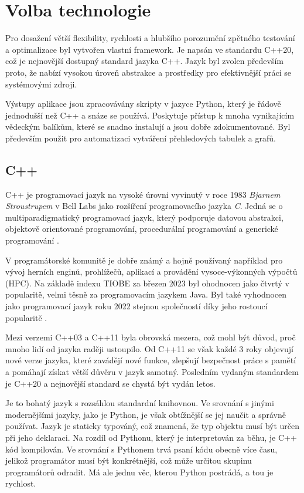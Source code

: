 \chapter{Volba technologie}
Pro dosažení větší flexibility, rychlosti a hlubšího porozumění zpětného testování a optimalizace byl vytvořen vlastní framework.
Je napsán ve standardu C++20, což je nejnovější dostupný standard jazyka C++.
Jazyk byl zvolen především proto, že nabízí vysokou úroveň abstrakce a prostředky pro efektivnější práci se systémovými zdroji.

Výstupy aplikace jsou zpracovávány skripty v jazyce Python, který je řádově jednodušší než C++ a snáze se používá.
Poskytuje přístup k mnoha vynikajícím vědeckým balíkům, které se snadno instalují a jsou dobře zdokumentované.
Byl především použit pro automatizaci vytváření přehledových tabulek a grafů.

\section{C++}
C++ je programovací jazyk na vysoké úrovni vyvinutý v roce 1983 \textit{Bjarnem Stroustrupem} v Bell Labs jako rozšíření programovacího jazyka \textit{C}.
Jedná se o multiparadigmatický programovací jazyk, který podporuje datovou abstrakci, objektově orientované programování, procedurální programování a generické programování \cite{cpp}.

V programátorské komunitě je dobře známý a hojně používaný například pro vývoj herních enginů, prohlížečů, aplikací a provádění vysoce-výkonných výpočtů (HPC).
Na základě indexu TIOBE za březen 2023 byl ohodnocen jako čtvrtý v popularitě, velmi těsně za programovacím jazykem Java.
Byl také vyhodnocen jako programovací jazyk roku 2022 stejnou společností díky jeho rostoucí popularitě  \cite{tiobe}.

Mezi verzemi C++03 a C++11 byla obrovská mezera, což mohl být důvod, proč mnoho lidí od jazyka raději ustoupilo.
Od C++11 se však každé 3 roky objevují nové verze jazyka, které zavádějí nové funkce, zlepšují bezpečnost práce s pamětí a pomáhají získat větší důvěru v jazyk samotný.
Posledním vydaným standardem je C++20 a nejnovější standard se chystá být vydán letos.

Je to bohatý jazyk s rozsáhlou standardní knihovnou.
Ve srovnání s jinými modernějšími jazyky, jako je Python, je však obtížnější se jej naučit a správně používat.
Jazyk je staticky typováný, což znamená, že typ objektu musí být určen při jeho deklaraci.
Na rozdíl od Pythonu, který je interpretován za běhu, je C++ kód kompilován.
Ve srovnání s Pythonem trvá psaní kódu obecně více času, jelikož programátor musí být konkrétnější, což může určitou skupinu programátorů odradit.
Má ale jednu věc, kterou Python postrádá, a tou je rychlost.

